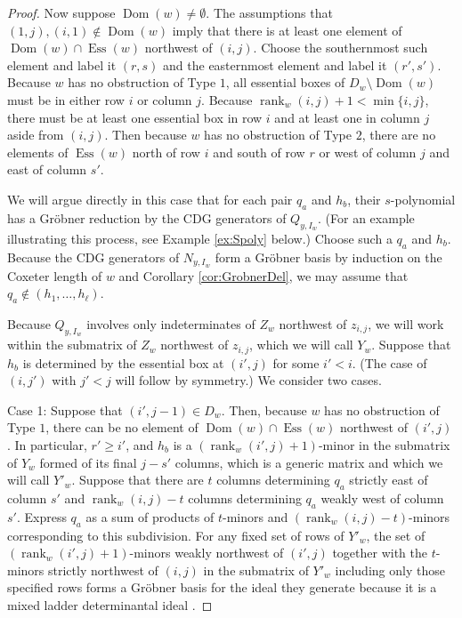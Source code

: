 \documentclass[ALCO,Unicode,published]{cedram}
\DeclareMathOperator{\Ess}{Ess}
\DeclareMathOperator{\rank}{rank}
\DeclareMathOperator{\Dom}{Dom}
\begin{document}
\begin{proof}
Now suppose $\Dom(w) \neq \emptyset$.  The assumptions that $(1,j), (i,1) \notin \Dom(w)$ imply that there is at least one element of $\Dom(w) \cap \Ess(w)$ northwest of $(i,j)$.  Choose the southernmost such element and label it $(r,s)$ and the easternmost element and label it $(r',s')$.  Because $w$ has no obstruction of Type $1$, all essential boxes of $D_w \setminus \Dom(w)$ must be in either row $i$ or column $j$.  Because $\rank_w(i,j)+1 < \min\{i,j\}$, there must be at least one essential box in row $i$ and at least one in column $j$ aside from $(i,j)$. Then because $w$ has no obstruction of Type $2$, there are no elements of $\Ess(w)$ north of row $i$ and south of row $r$ or west of column $j$ and east of column $s'$.  

We will argue directly in this case that for each pair $q_a$ and $h_b$, their $s$-polynomial has a Gr\"obner reduction by the CDG generators of $Q_{y,I_w}$.  (For an example illustrating this process, see Example \ref{ex:Spoly} below.)  Choose such a $q_a$ and $h_b$.  Because the CDG generators of $N_{y,I_w}$ form a Gr\"obner basis by induction on the Coxeter length of $w$ and Corollary \ref{cor:GrobnerDel}, we may assume that $q_a \notin (h_1, \ldots, h_\ell)$.  

Because $Q_{y,I_w}$ involves only indeterminates of $Z_w$ northwest of $z_{i,j}$, we will work within the submatrix of $Z_w$ northwest of $z_{i,j}$, which we will call $Y_w$.  Suppose that $h_b$ is determined by the essential box at $(i',j)$ for some $i'<i$.  (The case of $(i,j')$ with $j'<j$ will follow by symmetry.)  We consider two cases.  

Case 1: Suppose that $(i',j-1) \in D_w$.  Then, because $w$ has no obstruction of Type $1$, there can be no element of $\Dom(w) \cap \Ess(w)$ northwest of $(i',j)$.  In particular, $r' \geq i'$, and $h_b$ is a $(\rank_w(i',j)+1)$-minor in the submatrix of $Y_w$ formed of its final $j-s'$ columns, which is a generic matrix and which we will call $Y'_w$.  Suppose that there are $t$ columns determining $q_a$ strictly east of column $s'$ and $\rank_w(i,j)-t$ columns determining $q_a$ weakly west of column $s'$.  Express $q_a$ as a sum of products of $t$-minors and $(\rank_w(i,j)-t)$-minors corresponding to this subdivision.  For any fixed set of rows of $Y'_w$, the set of $(\rank_w(i',j)+1)$-minors weakly northwest of $(i',j)$ together with the $t$-minors strictly northwest of $(i,j)$ in the submatrix of $Y'_w$ including only those specified rows forms a Gr\"obner basis for the ideal they generate because it is a mixed ladder determinantal ideal \cite[Theorem 1.10]{Gor07}.  


\end{proof}
\end{document}
